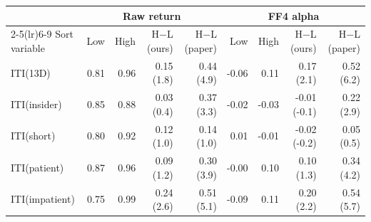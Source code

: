 \begin{tabular}{lrrrrrrrr}
\toprule
 & \multicolumn{4}{c}{Raw return} & \multicolumn{4}{c}{FF4 alpha} \\
\cmidrule(lr){2-5}\cmidrule(lr){6-9}
Sort variable & Low & High & H$-$L (ours) & H$-$L (paper) & Low & High & H$-$L (ours) & H$-$L (paper) \\
\midrule
ITI(13D) & 0.81 & 0.96 & 0.15 (1.8) & 0.44 (4.9) & -0.06 & 0.11 & 0.17 (2.1) & 0.52 (6.2) \\
ITI(insider) & 0.85 & 0.88 & 0.03 (0.4) & 0.37 (3.3) & -0.02 & -0.03 & -0.01 (-0.1) & 0.22 (2.9) \\
ITI(short) & 0.80 & 0.92 & 0.12 (1.0) & 0.14 (1.0) & 0.01 & -0.01 & -0.02 (-0.2) & 0.05 (0.5) \\
ITI(patient) & 0.87 & 0.96 & 0.09 (1.2) & 0.30 (3.9) & -0.00 & 0.10 & 0.10 (1.3) & 0.34 (4.2) \\
ITI(impatient) & 0.75 & 0.99 & 0.24 (2.6) & 0.51 (5.1) & -0.09 & 0.11 & 0.20 (2.2) & 0.54 (5.7) \\
\bottomrule
\end{tabular}
